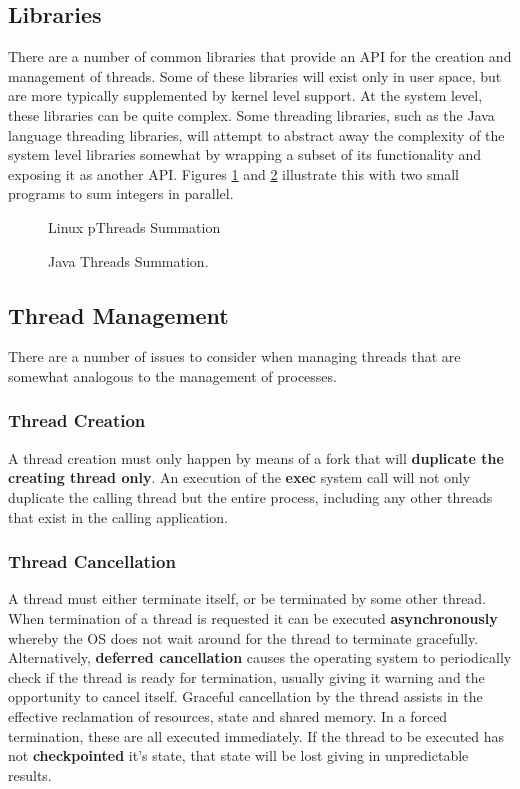 \documentclass[10pt,a4paper]{article}
\begin{document}
\subsection{Libraries}
There are a number of common libraries that provide an API for the creation and management of threads. Some of these libraries will exist only in user space, but are more typically supplemented by kernel level support. At the system level, these libraries can be quite complex. Some threading libraries, such as the Java language threading libraries, will attempt to abstract away the complexity of the system level libraries somewhat by wrapping a subset of its functionality and exposing it as another API. Figures \ref{pthread_sum} and \ref{linux_sum} illustrate this with two small programs to sum integers in parallel. 
\begin{figure}
\caption{Linux pThreads Summation \cite{OSCONCEPTS}}
\begin{center}

\label{pthread_sum}
\end{center}
\end{figure}
\begin{figure}
\caption{Java Threads Summation. \cite{OSCONCEPTS}}
\begin{center}

\label{linux_sum}
\end{center}
\end{figure}
\subsection{Thread Management}
There are a number of issues to consider when managing threads that are somewhat analogous to the management of processes. 
\subsubsection{Thread Creation}
A thread creation  must only happen by means of a fork that will {\bf duplicate the creating thread only}. An execution of the {\bf exec} system call will not only duplicate the calling thread but the entire process, including any other threads that exist in the calling application. 
\subsubsection{Thread Cancellation}
A thread must either terminate itself, or be terminated by some other thread. When termination of a thread is requested it can be executed {\bf asynchronously} whereby the OS does not wait around for the thread to terminate gracefully. Alternatively, {\bf deferred cancellation} causes the operating system to periodically check if the thread is ready for termination, usually giving it warning and the opportunity to cancel itself. Graceful cancellation by the thread assists in the effective reclamation of resources, state and shared memory. In a forced termination, these are all executed immediately. If the thread to be executed has not {\bf checkpointed} it's state, that state will be lost giving in unpredictable results.  
\end{document}

